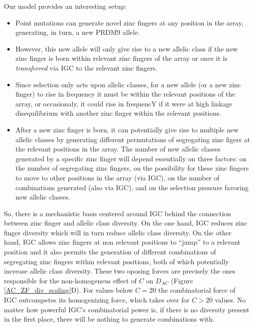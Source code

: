 \documentclass[a4paper,10pt]{article}
\begin{document}
Our model provides an interesting setup:
\begin{itemize}
 \item Point mutations can generate novel zinc fingers at any position in the array, generating, in turn, a new PRDM9 allele. 
 \item However, this new allele will only give rise to a new allelic class if the new zinc finger is born within relevant zinc fingers of the array or once it is \textit{transferred} via IGC to the relevant zinc fingers.
 \item Since selection only acts upon allelic classes, for a new allele (or a new zinc finger) to rise in frequency it must be within the relevant positions of the array, or occasionaly, it could rise in frequencY if it were at high linkage disequilibrium with another zinc finger within the relevant positions.
 \item After a new zinc finger is born, it can potentially give rise to multiple new allelic classes by generating different permutations of segregating zinc figers at the relevant positions in the array. The number of new allelic classes generated by a specific zinc finger will depend essentially on three factors: on the number of segregating zinc fingers, on the possibility for these zinc fingers to move to other positions in the array (via IGC), on the number of combinations generated (also via IGC), and on the selection pressure favoring new allelic classes.%
 \end{itemize}

 So, there is a mechanistic basis centered around IGC behind the connection between zinc finger and allelic class diversity. On the one hand, IGC reduces zinc finger diversity which will in turn reduce allelic class diversity. On the other hand, IGC allows zinc fingers at non relevant positions to ``jump'' to a relevant position and it also permits the generation of different combinations of segregating zinc fingers within relevant positions, both of which potentially increase allelic class diversity. These two oposing forces are precisely the ones responsible for the non-homogeneus effect of $C$ on $D_{AC}$ (Figure \ref{AC_ZF_div_scaling}D). For values below $C = 20$ the combinatorial force of IGC outcompetes its homogenizing force, which takes over for $C > 20$ values. No matter how powerful IGC's combinatorial power is, if there is no diversity present in the first place, there will be nothing to generate combinations with.  
 
\end{document}

